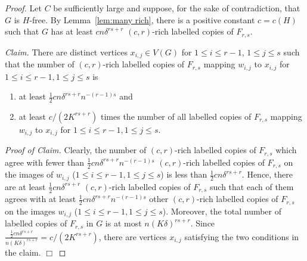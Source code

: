 \begin{proof}
	Let $C$ be sufficiently large and suppose, for the sake of contradiction, that $G$ is $H$-free. By Lemma~\ref{lem:many rich}, there is a positive constant $c=c(H)$ such that $G$ has at least $cn\delta^{rs+r}$ $(c,r)$-rich labelled copies of $F_{r,s}$.
	
	\medskip
	
	\noindent \emph{Claim.} There are distinct vertices $x_{i,j}\in V(G)$ for $1\leq i\leq r-1$, $1\leq j\leq s$ such that the number of $(c,r)$-rich labelled copies of $F_{r,s}$ mapping $w_{i,j}$ to $x_{i,j}$ for $1\leq i\leq r-1,1\leq j\leq s$ is
	\begin{enumerate}
		\item at least $\frac{1}{2}cn\delta^{rs+r}n^{-(r-1)s}$ and \label{property:many ext}
		\item at least $c/(2K^{rs+r})$ times the number of all labelled copies of $F_{r,s}$ mapping $w_{i,j}$ to $x_{i,j}$ for $1\leq i\leq r-1,1\leq j\leq s$. \label{property:relatively many ext}
	\end{enumerate}
	
	\medskip
	
	\noindent \emph{Proof of Claim.} Clearly, the number of $(c,r)$-rich labelled copies of $F_{r,s}$ which agree with fewer than $\frac{1}{2}cn\delta^{rs+r}n^{-(r-1)s}$ $(c,r)$-rich labelled copies of $F_{r,s}$ on the images of $w_{i,j}$ ($1\leq i\leq r-1,1\leq j\leq s$) is less than $\frac{1}{2}cn\delta^{rs+r}$. Hence, there are at least $\frac{1}{2}cn\delta^{rs+r}$ $(c,r)$-rich labelled copies of $F_{r,s}$ such that each of them agrees with at least $\frac{1}{2}cn\delta^{rs+r}n^{-(r-1)s}$ other $(c,r)$-rich labelled copies of $F_{r,s}$ on the images $w_{i,j}$ ($1\leq i\leq r-1,1\leq j\leq s$). Moreover, the total number of labelled copies of $F_{r,s}$ in $G$ is at most $n(K\delta)^{rs+r}$. Since $\frac{\frac{1}{2}cn\delta^{rs+r}}{n(K\delta)^{rs+r}}=c/(2K^{rs+r})$, there are vertices $x_{i,j}$ satisfying the two conditions in the claim. \hfill $\Box$
	
	\medskip
	

\end{proof}
